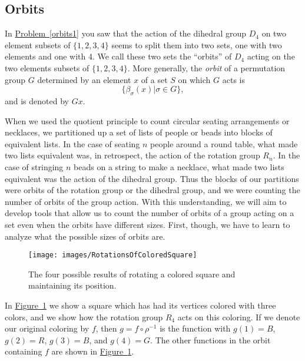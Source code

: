 \documentclass[10pt,]{book}
\theoremstyle{plain}
\theoremstyle{definition}
\numberwithin{equation}{chapter}
\begin{document}
\subsection[{Orbits}]{Orbits}\label{subsection-64}
In \hyperref[orbits1]{Problem~\ref{orbits1}} you saw that the action of the dihedral group \(D_4\) on two element subsets of \(\{1,2,3,4\}\) seems to split them into two sets, one with two elements and one with 4. We call these two sets the ``orbits'' of \(D_4\) acting on the two elements subsets of \(\{1,2,3,4\}\). More generally, the \emph{orbit} of a permutation group \(G\) determined by an element \(x\) of a set \(S\) on which \(G\) acts is%
\begin{equation*}
\{\beta_{\sigma}(x)| \sigma \in G\},
\end{equation*}
and is denoted by \(Gx\).%
\par
When we used the quotient principle to count circular seating arrangements or necklaces, we partitioned up a set of lists of people or beads into blocks of equivalent lists. In the case of seating \(n\) people around a round table, what made two lists equivalent was, in retrospect, the action of the rotation group \(R_n\). In the case of stringing \(n\) beads on a string to make a necklace, what made two lists equivalent was the action of the dihedral group. Thus the blocks of our partitions were orbits of the rotation group or the dihedral group, and we were counting the number of orbits of the group action. With this understanding, we will aim to develop tools that allow us to count the number of orbits of a group acting on a set even when the orbits have different sizes. First, though, we have to learn to analyze what the possible sizes of orbits are.%
\begin{figure}
\centering
\texttt{[image: images/RotationsOfColoredSquare]}
\caption{The four possible results of rotating a colored square and maintaining its position.\label{RotationsOfColoredSquare}}
\end{figure}
In \hyperref[RotationsOfColoredSquare]{Figure~\ref{RotationsOfColoredSquare}} we show a square which has had its vertices colored with three colors, and we show how the rotation group \(R_4\) acts on this coloring. If we denote our original coloring by \(f\), then \(g=f\circ\rho^{-1}\) is the function with \(g(1)=B\), \(g(2) = R\), \(g(3)=B\), and \(g(4)=G\). The other functions in the orbit containing \(f\) are shown in \hyperref[RotationsOfColoredSquare]{Figure~\ref{RotationsOfColoredSquare}}.%
\end{document}
